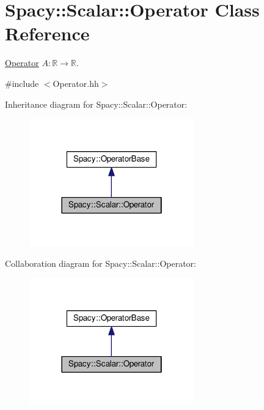 \hypertarget{classSpacy_1_1Scalar_1_1Operator}{\section{Spacy\-:\-:Scalar\-:\-:Operator Class Reference}
\label{classSpacy_1_1Scalar_1_1Operator}
}


\hyperlink{classSpacy_1_1Scalar_1_1Operator}{Operator} $A:\mathbb{R}\rightarrow\mathbb{R}$.  




{\ttfamily \#include $<$Operator.\-hh$>$}



Inheritance diagram for Spacy\-:\-:Scalar\-:\-:Operator\-:
\nopagebreak
\begin{figure}[H]
\begin{center}
\leavevmode
\includegraphics[width=202pt]{classSpacy_1_1Scalar_1_1Operator__inherit__graph}
\end{center}
\end{figure}


Collaboration diagram for Spacy\-:\-:Scalar\-:\-:Operator\-:
\nopagebreak
\begin{figure}[H]
\begin{center}
\leavevmode
\includegraphics[width=202pt]{classSpacy_1_1Scalar_1_1Operator__coll__graph}
\end{center}
\end{figure}
